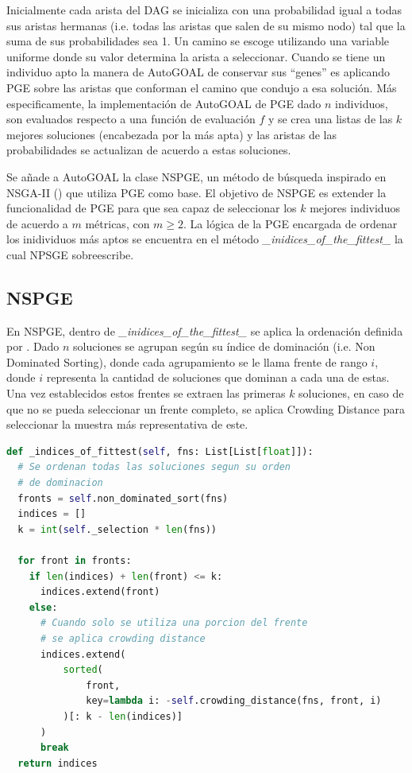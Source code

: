Inicialmente cada arista del DAG se inicializa con una probabilidad igual a todas sus aristas hermanas (i.e. todas las aristas que salen de su mismo nodo) tal que la suma de sus probabilidades sea 1. Un camino se escoge utilizando una variable uniforme donde su valor determina la arista a seleccionar. Cuando se tiene un individuo apto la manera de AutoGOAL de conservar sus ``genes'' es aplicando PGE sobre las aristas que conforman el camino que condujo a esa soluci\'on. M\'as especificamente, la implementaci\'on de AutoGOAL de PGE dado $n$ individuos, son evaluados respecto a una funci\'on de evaluaci\'on $f$ y se crea una listas de las $k$ mejores soluciones (encabezada por la m\'as apta) y las aristas de las probabilidades se actualizan de acuerdo a estas soluciones. 

Se a\~nade a AutoGOAL la clase NSPGE, un m\'etodo de b\'usqueda inspirado en NSGA-II (\cite{deb2002fast}) que utiliza PGE como base. El objetivo de NSPGE es extender la funcionalidad de PGE para que sea capaz de seleccionar los $k$ mejores individuos de acuerdo a $m$ m\'etricas, con $m \ge 2$. La l\'ogica de la PGE encargada de ordenar los inidividuos m\'as aptos se encuentra en el m\'etodo \textit{\_inidices\_of\_the\_fittest\_} la cual NPSGE sobreescribe.

\subsection{NSPGE}

En NSPGE, dentro de \textit{\_inidices\_of\_the\_fittest\_} se aplica la ordenaci\'on definida por \cite{deb2002fast}. Dado $n$ soluciones se  agrupan seg\'un su \'indice de dominaci\'on (i.e. Non Dominated Sorting), donde cada agrupamiento se le llama frente de rango $i$, donde $i$ representa la cantidad de soluciones que dominan a cada una de estas. Una vez establecidos estos frentes se extraen las primeras $k$ soluciones, en caso de que no se pueda seleccionar un frente completo, se aplica Crowding Distance para seleccionar la muestra m\'as representativa de este.


\begin{lstlisting}[caption=Nueva ordenaci\'on, language=Python]
def _indices_of_fittest(self, fns: List[List[float]]):
  # Se ordenan todas las soluciones segun su orden
  # de dominacion
  fronts = self.non_dominated_sort(fns)
  indices = []
  k = int(self._selection * len(fns))

  for front in fronts:
    if len(indices) + len(front) <= k:
      indices.extend(front)
    else:
      # Cuando solo se utiliza una porcion del frente
      # se aplica crowding distance
      indices.extend(
          sorted(
              front,
              key=lambda i: -self.crowding_distance(fns, front, i)
          )[: k - len(indices)]
      )
      break
  return indices
\end{lstlisting}

